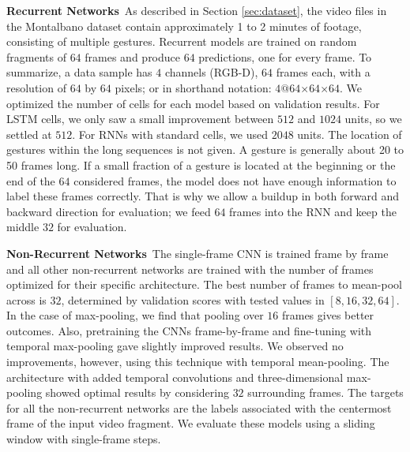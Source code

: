 \documentclass[11pt,a4paper]{article} \usepackage{a4wide}
\begin{document}
\textbf{Recurrent Networks}\, As described in Section \ref{sec:dataset}, the video files in the Montalbano dataset contain approximately 1 to 2 minutes of footage, consisting of multiple gestures. Recurrent models are trained on random fragments of $64$ frames and produce $64$ predictions, one for every frame. To summarize, a data sample has $4$ channels (RGB-D), $64$ frames each, with a resolution of $64$ by $64$ pixels; or in shorthand notation: $4@64$$\times$$64$$\times$$64$. We optimized the number of cells for each model based on validation results. For LSTM cells, we only saw a small improvement between $512$ and $1024$ units, so we settled at $512$. For RNNs with standard cells, we used $2048$ units. 
The location of gestures within the long sequences is not given. A gesture is generally about 20 to 50 frames long. If a small fraction of a gesture is located at the beginning or the end of the $64$ considered frames, the model does not have enough information to label these frames correctly. That is why we allow a buildup in both forward and backward direction for evaluation; we feed $64$ frames into the RNN and keep the middle $32$ for evaluation.


\textbf{Non-Recurrent Networks}\, The single-frame CNN is trained frame by frame and all other non-recurrent networks are trained with the number of frames optimized for their specific architecture. The best number of frames to mean-pool across is $32$, determined by validation scores with tested values in $[8,16,32,64]$. In the case of max-pooling, we find that pooling over $16$ frames gives better outcomes. Also, pretraining the CNNs frame-by-frame and fine-tuning with temporal max-pooling gave slightly improved results. We observed no improvements, however, using this technique with temporal mean-pooling. The architecture with added temporal convolutions and three-dimensional max-pooling showed optimal results by considering $32$ surrounding frames. The targets for all the non-recurrent networks are the labels associated with the centermost frame of the input video fragment. We evaluate these models using a sliding window with single-frame steps.
\end{document}
